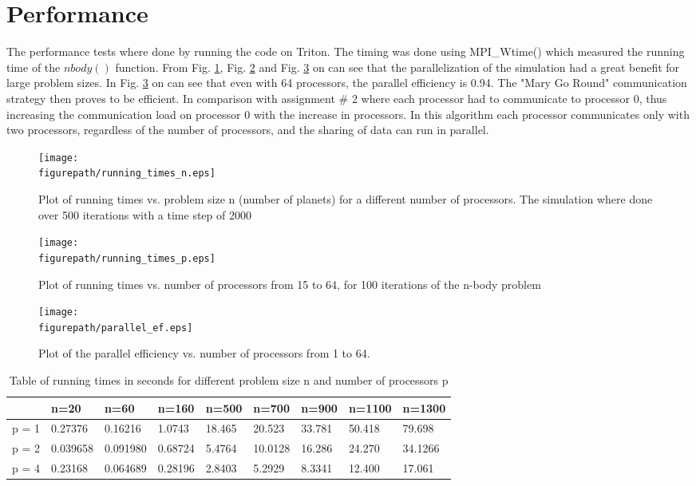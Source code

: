 \clearpage
\section{Performance}
The performance tests where done by running the code on Triton. The timing was done using MPI\_Wtime() which measured the running time of  the $nbody()$ function.
From Fig. \ref{fig:n}, Fig. \ref{fig:p} and Fig. \ref{fig:ef} on can see that the parallelization of the simulation had a great benefit for large problem sizes. In Fig. \ref{fig:ef} on can see that even with 64 processors, the parallel efficiency is 0.94. The "Mary Go Round" communication strategy then proves to be efficient. In comparison with assignment \# 2 where each processor had to communicate to processor 0, thus increasing the communication load on processor 0 with the increase in processors. In this algorithm each processor communicates only with two processors, regardless of the number of processors, and the sharing of data can run in parallel. 




\begin{figure}[h!] 
 \center 
 \texttt{[image: \\figurepath/running\_times\_n.eps]}
 \caption{Plot of running times vs. problem size n (number of planets) for a different number of processors. The simulation where done over 500 iterations with a time step of 2000 \label{fig:n}}
 \end{figure}

\begin{figure}[h!] 
 \center 
 \texttt{[image: \\figurepath/running\_times\_p.eps]}
 \caption{ Plot of running times vs. number of processors from 15 to 64, for 100 iterations of the n-body problem \label{fig:p}}
 \end{figure}

\begin{figure}[h!] 
 \center 
 \texttt{[image: \\figurepath/parallel\_ef.eps]}
 \caption{ Plot of the parallel efficiency vs. number of processors from 1 to 64. \label{fig:ef}}
 \end{figure}


\clearpage


\begin{table}
\caption{Table of running times in seconds for different problem size n and number of processors p}
\begin{tabular}{|l|l|l|l|l|l|l|l|l|}
\hline
 & n=20 & n=60 & n=160 & n=500 & n=700 & n=900 & n=1100 & n=1300 \\ \hline
p = 1 & 0.27376 & 0.16216 & 1.0743 & 18.465 & 20.523 & 33.781 & 50.418 & 79.698 \\ 
p = 2 & 0.039658 & 0.091980 & 0.68724 & 5.4764 & 10.0128 & 16.286 & 24.270 & 34.1266 \\ 
p = 4 & 0.23168 & 0.064689 & 0.28196 & 2.8403 & 5.2929 & 8.3341 & 12.400 & 17.061 \\
\hline
\end{tabular}
\end{table}



